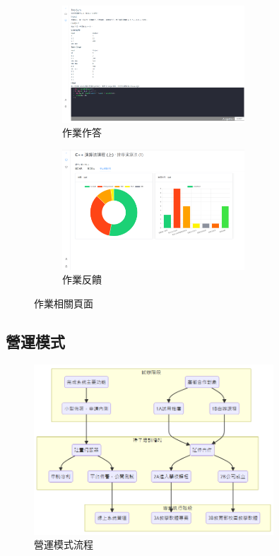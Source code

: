 \begin{figure}[H]
  \begin{subfigure}{0.5\linewidth}
    \centering
    \includegraphics[width=0.75\textwidth]{images/homework.png}
    \caption{作業作答}
  \end{subfigure}
  \begin{subfigure}{0.5\linewidth}
    \centering
    \includegraphics[width=0.75\textwidth]{images/feedback.png}
    \caption{作業反饋}
  \end{subfigure}
  \caption{作業相關頁面}
  \label{fig:homework}
\end{figure}

\newpage
\subsection{營運模式}

\begin{figure}[H]
  \centering
  \includegraphics[width=0.8\textwidth]{images/Ops-flow.png}
  \caption{營運模式流程}
\end{figure}

